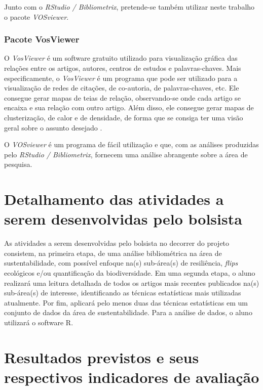 \documentclass{article}[12pt]
\begin{document}
Junto com o \textit{RStudio / Bibliometrix}, pretende-se também utilizar neste trabalho o pacote
\textit{VOSviewer}.


\subsubsection{Pacote VosViewer}

O \textit{VosViewer} é um software gratuito utilizado para visualização gráfica das relações entre
os artigos, autores, centros de estudos e palavras-chaves. Mais especificamente, o
\textit{VosViewer} é um programa que pode ser utilizado para a visualização de redes de citações, de
co-autoria, de palavras-chaves, etc. Ele consegue gerar mapas de teias de relação, observando-se
onde cada artigo se encaixa e sua relação com outro artigo. Além disso, ele consegue gerar mapas de
clusterização, de calor e de densidade, de forma que se consiga ter uma visão geral sobre o assunto
desejado \cite{VOSviewer2010}. \par

O \textit{VOSviewer} é um programa de fácil utilização e que, com as análises produzidas pelo
\textit{RStudio / Bibliometrix}, fornecem uma análise abrangente sobre a área de pesquisa.



\section{Detalhamento das atividades a serem desenvolvidas pelo bolsista}

As atividades a serem desenvolvidas pelo bolsista no decorrer do projeto consistem, na primeira
etapa, de uma análise bibliométrica na área de sustentabilidade, com possível enfoque na(s)
sub-área(s) de resiliência, \textit{flips} ecológicos e/ou quantificação da biodiversidade. Em uma
segunda etapa, o aluno realizará uma leitura detalhada de todos os artigos mais recentes publicados
na(s) sub-área(s) de interesse, identificando as técnicas estatísticas mais utilizadas atualmente.
Por fim, aplicará pelo menos duas das técnicas estatísticas em um conjunto de dados da área de
sustentabilidade. Para a análise de dados, o aluno utilizará o software R.

\section{Resultados previstos e seus respectivos indicadores de avaliação}
\end{document}
